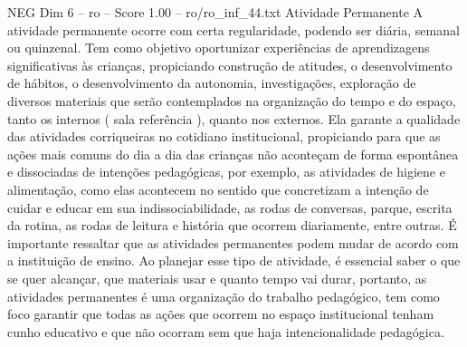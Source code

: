 \begin{textsample}{NEG Dim 6 – ro – Score 1.00 – ro/ro\_inf\_44.txt}  \label{ex:f6_neg_154}
Atividade Permanente A atividade permanente ocorre com certa regularidade, podendo ser diária, semanal ou quinzenal.
Tem como objetivo oportunizar experiências de aprendizagens significativas às crianças, propiciando construção de atitudes, o desenvolvimento de hábitos, o desenvolvimento da autonomia, investigações, exploração de diversos materiais que serão contemplados na organização do tempo e do espaço, tanto os internos ( sala referência ), quanto nos externos.
Ela garante a qualidade das atividades corriqueiras no cotidiano institucional, propiciando para que as ações mais comuns do dia a dia das crianças não aconteçam de forma espontânea e dissociadas de intenções pedagógicas, por exemplo, as atividades de higiene e alimentação, como elas acontecem no sentido que concretizam a intenção de cuidar e educar em sua indissociabilidade, as rodas de conversas, parque, escrita da rotina, as rodas de leitura e história que ocorrem diariamente, entre outras.
É importante ressaltar que as atividades permanentes podem mudar de acordo com a instituição de ensino.
Ao planejar esse tipo de atividade, é essencial saber o que se quer alcançar, que materiais usar e quanto tempo vai durar, portanto, as atividades permanentes é uma organização do trabalho pedagógico, tem como foco garantir que todas as ações que ocorrem no espaço institucional tenham cunho educativo e que não ocorram sem que haja intencionalidade pedagógica.

\end{textsample}

